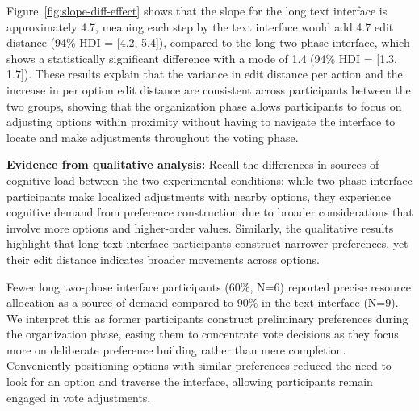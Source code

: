 Figure~\ref{fig:slope-diff-effect} shows that the slope for the long text interface is approximately 4.7, meaning each step by the text interface would add 4.7 edit distance (94\% HDI = [4.2, 5.4]), compared to the long two-phase interface, which shows a statistically significant difference with a mode of 1.4 (94\% HDI = [1.3, 1.7]). These results explain that the variance in edit distance per action and the increase in per option edit distance are consistent across participants between the two groups, showing that the organization phase allows participants to focus on adjusting options within proximity without having to navigate the interface to locate and make adjustments throughout the voting phase.

\textbf{Evidence from qualitative analysis:} Recall the differences in sources of cognitive load between the two experimental conditions: while two-phase interface participants make localized adjustments with nearby options, they experience cognitive demand from preference construction due to broader considerations that involve more options and higher-order values. Similarly, the qualitative results highlight that long text interface participants construct narrower preferences, yet their edit distance indicates broader movements across options.

Fewer long two-phase interface participants (60\%, N=6) reported precise resource allocation as a source of demand compared to 90\% in the text interface (N=9). We interpret this as former participants construct preliminary preferences during the organization phase, easing them to concentrate vote decisions as they focus more on deliberate preference building rather than mere completion. Conveniently positioning options with similar preferences reduced the need to look for an option and traverse the interface, allowing participants remain engaged in vote adjustments.

